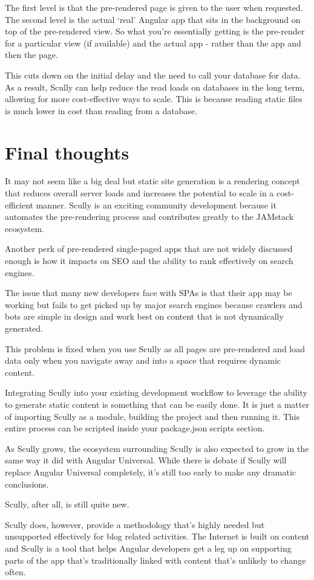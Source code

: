 The first level is that the pre-rendered page is given to the user when requested. The second level is the actual ‘real' Angular app that sits in the background on top of the pre-rendered view. So what you're essentially getting is the pre-render for a particular view (if available) and the actual app - rather than the app and then the page.

This cuts down on the initial delay and the need to call your database for data. As a result, Scully can help reduce the read loads on databases in the long term, allowing for more cost-effective ways to scale. This is because reading static files is much lower in cost than reading from a database.  

\section{Final thoughts}
It may not seem like a big deal but static site generation is a rendering concept that reduces overall server loads and increases the potential to scale in a cost-efficient manner. Scully is an exciting community development because it automates the pre-rendering process and contributes greatly to the JAMstack ecosystem. 

Another perk of pre-rendered single-paged apps that are not widely discussed enough is how it impacts on SEO and the ability to rank effectively on search engines. 

The issue that many new developers face with SPAs is that their app may be working but fails to get picked up by major search engines because crawlers and bots are simple in design and work best on content that is not dynamically generated.

This problem is fixed when you use Scully as all pages are pre-rendered and load data only when you navigate away and into a space that requires dynamic content. 

Integrating Scully into your existing development workflow to leverage the ability to generate static content is something that can be easily done. It is just a matter of importing Scully as a module, building the project and then running it. This entire process can be scripted inside your package.json scripts section. 

As Scully grows, the ecosystem surrounding Scully is also expected to grow in the same way it did with Angular Universal. While there is debate if Scully will replace Angular Universal completely, it's still too early to make any dramatic conclusions.

Scully, after all, is still quite new. 

Scully does, however, provide a methodology that's highly needed but unsupported effectively for blog related activities. The Internet is built on content and Scully is a tool that helps Angular developers get a leg up on supporting parts of the app that's traditionally linked with content that's unlikely to change often. 
